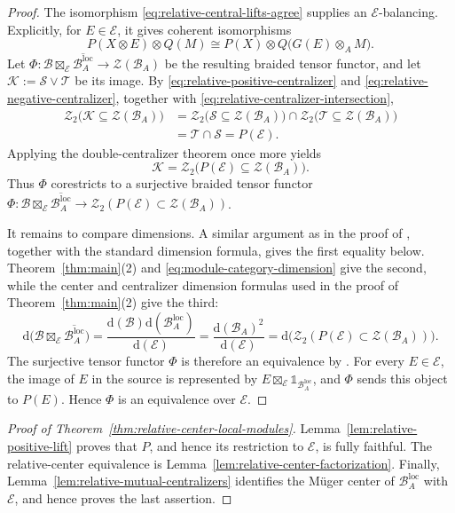 \documentclass[11pt,reqno]{amsart}
\numberwithin{equation}{section}
\theoremstyle{plain}
\theoremstyle{definition}
\theoremstyle{remark}
\newcommand{\unit}{\mathds{1}}
\newcommand{\B}{\mathcal{B}}
\newcommand{\E}{\mathcal{E}}
\newcommand{\Z}{\mathcal{Z}}
\newcommand{\T}{\mathcal{T}}
\newcommand{\cS}{\mathcal{S}}
\newcommand{\loc}{\mathrm{loc}}
\newcommand{\FP}{\mathrm{d}}
\begin{document}
\begin{proof}
The isomorphism \eqref{eq:relative-central-lifts-agree} supplies an
$\E$-balancing. Explicitly, for $E\in\E$, it gives coherent isomorphisms
\[
  P(X\otimes E)\otimes Q(M)
  \cong
  P(X)\otimes Q\bigl(G(E)\otimes_A M\bigr).
\]
Let $\Phi:\B\boxtimes_{\E}\overline{\B_A^\loc}\to\Z(\B_A)$ be the resulting braided
tensor functor, and let $\mathcal K:=\cS\vee\T$ be its image. By
\eqref{eq:relative-positive-centralizer} and
\eqref{eq:relative-negative-centralizer}, together with
\eqref{eq:relative-centralizer-intersection},
\[
\begin{aligned}
  \Z_2\bigl(\mathcal K\subseteq\Z(\B_A)\bigr)
  &=
  \Z_2\bigl(\cS\subseteq\Z(\B_A)\bigr)
  \cap
  \Z_2\bigl(\T\subseteq\Z(\B_A)\bigr)
  \\
  &=
  \T\cap\cS
  =
  P(\E).
\end{aligned}
\]
Applying the double-centralizer theorem once more yields
\[
  \mathcal K
  =
  \Z_2\bigl(P(\E)\subseteq\Z(\B_A)\bigr).
\]
Thus $\Phi$ corestricts to a surjective braided tensor functor $\Phi: \B\boxtimes_{\E}\overline{\B_A^\loc} \longrightarrow \Z_2(P(\E) \subset \Z(\B_A))$.

It remains to compare dimensions. A similar argument as in the proof of 
\cite[Theorem~3.2.1]{decoppet2025invertibility}, together with the
standard dimension formula, gives the first equality below.
Theorem~\ref{thm:main}(2) and \eqref{eq:module-category-dimension} give the
second, while the center and centralizer dimension formulas used in the proof
of Theorem~\ref{thm:main}(2) give the third:
\[
  \FP\bigl(\B\boxtimes_{\E}\overline{\B_A^\loc}\bigr)
  =\frac{\FP(\B)\FP(\B_A^\loc)}{\FP(\E)}
  =\frac{\FP(\B_A)^2}{\FP(\E)}
  =\FP\bigl(\Z_2(P(\E)\subset \Z(\B_A))\bigr).
\]
The surjective tensor functor $\Phi$ is therefore an equivalence by
\cite[Proposition~6.3.4]{etingof2016tensor}. For every $E\in\E$, the image of $E$ in the source is represented by $E\boxtimes_{\E}\unit_{\B_A^\loc}$, and $\Phi$ sends this object to
$P(E)$. Hence $\Phi$ is an equivalence over $\E$.
\end{proof}

\begin{proof}[Proof of Theorem~\ref{thm:relative-center-local-modules}]
Lemma~\ref{lem:relative-positive-lift} proves that $P$, and hence its
restriction to $\E$, is fully faithful. The relative-center equivalence is
Lemma~\ref{lem:relative-center-factorization}. Finally,
Lemma~\ref{lem:relative-mutual-centralizers} identifies the M\"uger center of
$\B_A^{\loc}$ with $\E$, and hence proves the last assertion.
\end{proof}
\end{document}
